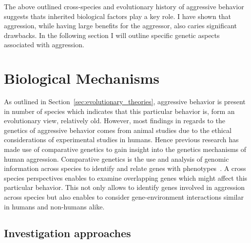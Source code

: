\documentclass[../header.tex]{subfiles}
\begin{document}
The above outlined cross-species and evolutionary history of aggressive behavior suggests thats inherited biological factors play a key role.
I have shown that aggression, while having large benefits for the aggressor, also caries significant drawbacks.
In the following section I will outline specific genetic aspects associated with aggression.


\section{Biological Mechanisms}
\label{sec:biological_mechanisms}

As outlined in Section~\ref{sec:evolutionary_theories}, aggressive behavior is present in number of species which indicates that this particular behavior is, form an evolutionary view, relatively old.
However, most findings in regards to the genetics of aggressive behavior comes from animal studies due to the ethical considerations of experimental studies in humans.
Hence previous research has made use of comparative genetics to gain insight into the genetics mechanisms of human aggression.
Comparative genetics is the use and analysis of genomic information across species to identify and relate genes with phenotypes~\cite{Maxson2003}.
A cross species perspectives enables to examine overlapping genes which might affect this particular behavior.
This not only allows to identify genes involved in aggression across species but also enables to consider gene-environment interactions similar in humans and non-humans alike.

\subsection{Investigation approaches}
\label{sub:investigation_approaches}
\end{document}
